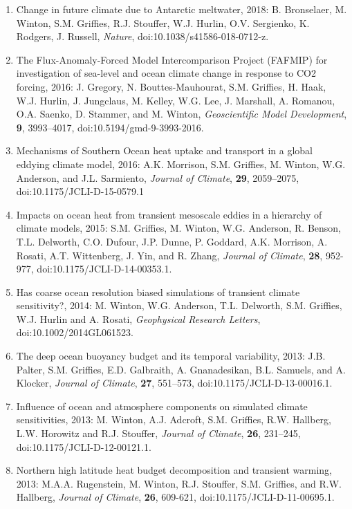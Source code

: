\begin{enumerate}[leftmargin=*]
\item Change in future climate due to Antarctic meltwater, 2018: B. Bronselaer, M. Winton, S.M. Grif\/f\/ies, R.J. Stouffer, W.J. Hurlin, O.V. Sergienko, K. Rodgers, J. Russell, {\it  Nature}, doi:10.1038/s41586-018-0712-z.

\item The Flux-Anomaly-Forced Model Intercomparison Project (FAFMIP) for investigation of sea-level and ocean climate change in response to CO2 forcing, 2016: J. Gregory, N. Bouttes-Mauhourat, S.M. Grif\/f\/ies, H. Haak, W.J. Hurlin, J.  Jungclaus, M. Kelley, W.G. Lee, J. Marshall, A. Romanou, O.A. Saenko, D. Stammer, and M.  Winton, {\it Geoscientific Model Development},
  {\bf 9}, 3993--4017, doi:10.5194/gmd-9-3993-2016.

\item Mechanisms of Southern Ocean heat uptake and transport in a global eddying climate model, 2016: A.K. Morrison, S.M. Grif\/f\/ies, M. Winton, W.G. Anderson, and J.L. Sarmiento, {\it Journal of Climate}, {\bf 29}, 2059--2075, doi:10.1175/JCLI-D-15-0579.1

\item Impacts on ocean heat from transient mesoscale eddies in a hierarchy of climate models, 2015: S.M. Grif\/f\/ies, M. Winton, W.G. Anderson, R. Benson, T.L. Delworth, C.O. Dufour, J.P. Dunne, P. Goddard, A.K. Morrison, A. Rosati, A.T. Wittenberg, J. Yin, and R. Zhang, {\it Journal of Climate}, {\bf 28}, 952-977, doi:10.1175/JCLI-D-14-00353.1.

\item Has coarse ocean resolution biased simulations of transient climate sensitivity?, 2014: M.  Winton, W.G. Anderson, T.L. Delworth, S.M. Grif\/f\/ies, W.J. Hurlin and A. Rosati, {\it Geophysical Research Letters}, doi:10.1002/2014GL061523.

\item The deep ocean buoyancy budget and its temporal variability,  2013: J.B. Palter, S.M. Grif\/f\/ies, E.D. Galbraith,  A. Gnanadesikan, B.L. Samuels, and A. Klocker, {\it Journal of Climate}, {\bf 27}, 551--573,   doi:10.1175/JCLI-D-13-00016.1.

\item Influence of ocean and atmosphere components on simulated climate sensitivities, 2013: M. Winton, A.J. Adcroft, S.M. Grif\/f\/ies, R.W. Hallberg, L.W. Horowitz and R.J. Stouffer, {\it Journal of Climate}, {\bf 26}, 231--245,  doi:10.1175/JCLI-D-12-00121.1.

\item Northern high latitude heat budget decomposition and transient warming, 2013: M.A.A. Rugenstein, M. Winton, R.J. Stouffer, S.M. Grif\/f\/ies, and R.W. Hallberg, {\it Journal of Climate}, {\bf 26}, 609-621, doi:10.1175/JCLI-D-11-00695.1.


\end{enumerate}
